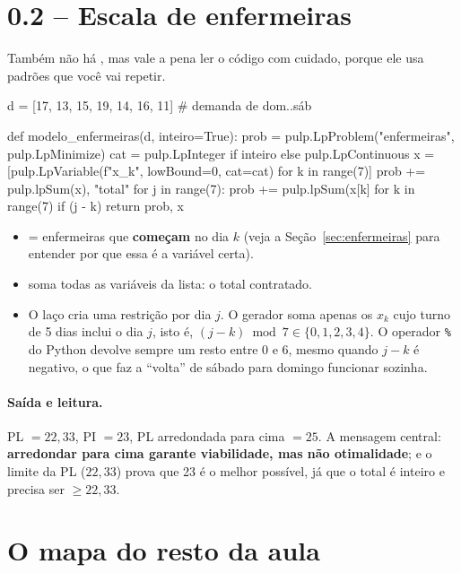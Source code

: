 \section{0.2 -- Escala de enfermeiras}

Também não há , mas vale a pena ler o código com cuidado, porque ele usa padrões que você vai repetir.

\begin{codigo}
d = [17, 13, 15, 19, 14, 16, 11]          # demanda de dom..sáb

def modelo_enfermeiras(d, inteiro=True):
    prob = pulp.LpProblem("enfermeiras", pulp.LpMinimize)
    cat = pulp.LpInteger if inteiro else pulp.LpContinuous
    x = [pulp.LpVariable(f"x_{k}", lowBound=0, cat=cat) for k in range(7)]
    prob += pulp.lpSum(x), "total"
    for j in range(7):
        prob += pulp.lpSum(x[k] for k in range(7) if (j - k) %
    return prob, x
\end{codigo}

\begin{itemize}
  \item {} = enfermeiras que \textbf{começam} no dia $k$ (veja a Seção~\ref{sec:enfermeiras} para entender por
  que essa é a variável certa).
  \item {} soma todas as variáveis da lista: o total contratado.
  \item O laço cria uma restrição por dia $j$. O gerador soma apenas os $x_k$ cujo turno de 5 dias inclui o dia $j$,
  isto é, $(j-k)\bmod 7\in\{0,1,2,3,4\}$. O operador \texttt{\%} do Python devolve sempre um resto entre 0 e 6, mesmo
  quando $j-k$ é negativo, o que faz a ``volta'' de sábado para domingo funcionar sozinha.
\end{itemize}

\paragraph{Saída e leitura.} PL $=22{,}33$, PI $=23$, PL arredondada para cima $=25$. A mensagem central:
\textbf{arredondar para cima garante viabilidade, mas não otimalidade}; e o limite da PL ($22{,}33$) prova que 23 é o
melhor possível, já que o total é inteiro e precisa ser $\ge 22{,}33$.

\section{O mapa do resto da aula}

